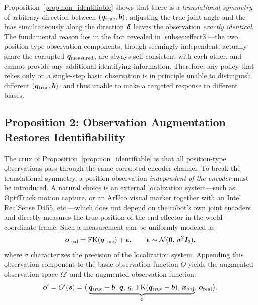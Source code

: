 Proposition~\ref{prop:non_identifiable} shows that there is a \emph{translational symmetry} of arbitrary direction between $(\bm{q}_{\text{true}}, \bm{b})$: adjusting the true joint angle and the bias simultaneously along the direction $\bm{\delta}$ leaves the observation \emph{exactly identical}. The fundamental reason lies in the fact revealed in \cref{subsec:effect3}---the two position-type observation components, though seemingly independent, actually share the corrupted $\bm{q}_{\text{measured}}$, are always self-consistent with each other, and cannot provide any additional identifying information. Therefore, any policy that relies only on a single-step basic observation is in principle unable to distinguish different $(\bm{q}_{\text{true}}, \bm{b})$, and thus unable to make a targeted response to different biases.

\subsection{Proposition 2: Observation Augmentation Restores Identifiability}\label{subsec:identifiable_augmented}

The crux of Proposition~\ref{prop:non_identifiable} is that all position-type observations pass through the same corrupted encoder channel. To break the translational symmetry, a position observation \emph{independent of the encoder} must be introduced. A natural choice is an external localization system---such as OptiTrack motion capture, or an ArUco visual marker together with an Intel RealSense D455, etc.---which does not depend on the robot's own joint encoders and directly measures the true position of the end-effector in the world coordinate frame. Such a measurement can be uniformly modeled as
\begin{equation}
  \bm{o}_{\text{real}} = \text{FK}(\bm{q}_{\text{true}}) + \bm{\epsilon}, \qquad \bm{\epsilon} \sim \mathcal{N}(\bm{0},\,\sigma^2 \bm{I}_3),
  \label{eq:real_tcp}
\end{equation}
where $\sigma$ characterizes the precision of the localization system. Appending this observation component to the basic observation function $O$ yields the augmented observation space $\Omega'$ and the augmented observation function:
\begin{equation}
  \bm{o}' = O'(\bm{s}) = \big(\underbrace{\bm{q}_{\text{true}} + \bm{b},\,\dot{\bm{q}},\,g,\,\text{FK}(\bm{q}_{\text{true}} + \bm{b}),\,\bm{x}_{\text{obj}}}_{\bm{o}},\,\bm{o}_{\text{real}}\big).
  \label{eq:obs_augmented}
\end{equation}

